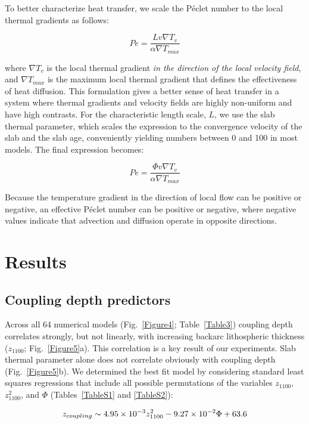 \documentclass[draft]{assets/agujournal2019}
\begin{document}
To better characterize heat transfer, we scale the P\'{e}clet number to the local thermal gradients as follows:

\begin{equation}
 Pe=\frac{Lv\nabla T_v}{\alpha\nabla T_{max}}
 \label{Equation4}
\end{equation}

where $\nabla T_v$ is the local thermal gradient \protect\textit{in the direction of the local velocity field}, and $\nabla T_{max}$ is the maximum local thermal gradient that defines the effectiveness of heat diffusion. This formulation gives a better sense of heat transfer in a system where thermal gradients and velocity fields are highly non-uniform and have high contrasts. For the characteristic length scale, $L$, we use the slab thermal parameter, which scales the expression to the convergence velocity of the slab and the slab age, conveniently yielding numbers between 0 and 100 in most models. The final expression becomes:

\begin{equation}
 Pe=\frac{\Phi v\nabla T_v}{\alpha\nabla T_{max}}
 \label{Equation5}
\end{equation}

Because the temperature gradient in the direction of local flow can be positive or negative, an effective P\'{e}clet number can be positive or negative, where negative values indicate that advection and diffusion operate in opposite directions.

\section{Results}
\subsection{Coupling depth predictors}
Across all 64 numerical models (Fig.~\ref{Figure4}; Table~\ref{Table3}) coupling depth correlates strongly, but not linearly, with increasing backarc lithospheric thickness ($z_{1100}$; Fig.~\ref{Figure5}a). This correlation is a key result of our experiments. Slab thermal parameter alone does not correlate obviously with coupling depth (Fig.~\ref{Figure5}b). We determined the best fit model by considering standard least squares regressions that include all possible permutations of the variables $z_{1100}$, $z_{1100}^2$, and $\Phi$ (Tables~\ref{TableS1} and \ref{TableS2}):

\begin{equation}
 z_{coupling}\sim \num{4.95d-3}z_{1100}^2-\num{9.27d-2}\Phi+63.6
 \label{Equation6}
\end{equation}
\end{document}

